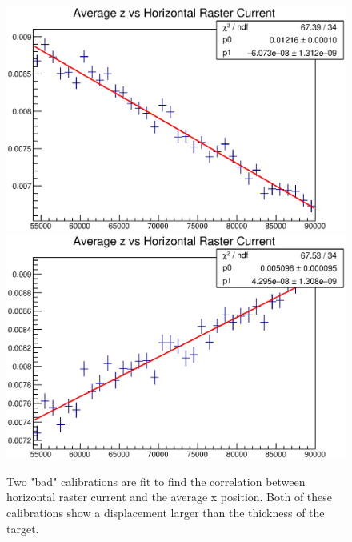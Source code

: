 \begin{figure}
	\includegraphics[width=\textwidth]{./chap3-analysis/fig/old1_avgz.eps}
	\includegraphics[width=\textwidth]{./chap3-analysis/fig/old2_avgz.eps}
	\caption{Two "bad" calibrations are fit to find the correlation between horizontal raster current and the average x position. Both of these calibrations show a displacement larger than the thickness of the target.}
\end{figure}
